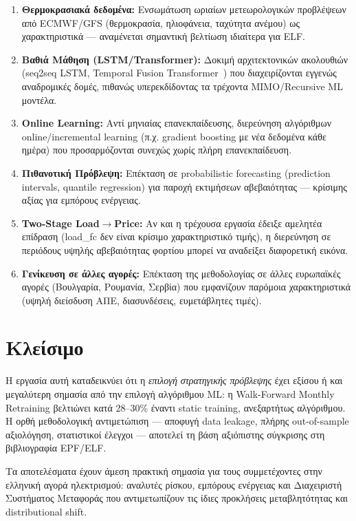 \begin{enumerate}
    \item \textbf{Θερμοκρασιακά δεδομένα:} Ενσωμάτωση ωριαίων μετεωρολογικών
    προβλέψεων από ECMWF/GFS (θερμοκρασία, ηλιοφάνεια, ταχύτητα ανέμου) ως
    χαρακτηριστικά — αναμένεται σημαντική βελτίωση ιδιαίτερα για ELF.

    \item \textbf{Βαθιά Μάθηση (LSTM/Transformer):} Δοκιμή αρχιτεκτονικών
    ακολουθιών (seq2seq LSTM, Temporal Fusion Transformer~\cite{lim2021temporal})
    που διαχειρίζονται εγγενώς αναδρομικές δομές, πιθανώς υπερεκδίδοντας τα
    τρέχοντα MIMO/Recursive ML μοντέλα.

    \item \textbf{Online Learning:} Αντί μηνιαίας επανεκπαίδευσης, διερεύνηση
    αλγόριθμων online/incremental learning (π.χ. gradient boosting με
    νέα δεδομένα κάθε ημέρα) που προσαρμόζονται συνεχώς χωρίς πλήρη
    επανεκπαίδευση.

    \item \textbf{Πιθανοτική Πρόβλεψη:} Επέκταση σε probabilistic forecasting
    (prediction intervals, quantile regression) για παροχή εκτιμήσεων
    αβεβαιότητας — κρίσιμης αξίας για εμπόρους ενέργειας.

    \item \textbf{Two-Stage Load$\to$Price:} Αν και η τρέχουσα εργασία έδειξε
    αμελητέα επίδραση (load\_fc δεν είναι κρίσιμο χαρακτηριστικό τιμής),
    η διερεύνηση σε περιόδους υψηλής αβεβαιότητας φορτίου μπορεί να
    αναδείξει διαφορετική εικόνα.

    \item \textbf{Γενίκευση σε άλλες αγορές:} Επέκταση της μεθοδολογίας σε
    άλλες ευρωπαϊκές αγορές (Βουλγαρία, Ρουμανία, Σερβία) που εμφανίζουν
    παρόμοια χαρακτηριστικά (υψηλή διείσδυση ΑΠΕ, διασυνδέσεις, ευμετάβλητες
    τιμές).
\end{enumerate}

\section{Κλείσιμο}
\label{sec:conc_closing}

Η εργασία αυτή καταδεικνύει ότι η \textit{επιλογή στρατηγικής πρόβλεψης} έχει
εξίσου ή και μεγαλύτερη σημασία από την επιλογή αλγόριθμου ML: η Walk-Forward
Monthly Retraining βελτιώνει κατά 28--30\% έναντι static training, ανεξαρτήτως
αλγόριθμου. Η ορθή μεθοδολογική αντιμετώπιση — αποφυγή data leakage, πλήρης
out-of-sample αξιολόγηση, στατιστικοί έλεγχοι — αποτελεί τη βάση αξιόπιστης
σύγκρισης στη βιβλιογραφία EPF/ELF.

Τα αποτελέσματα έχουν άμεση πρακτική σημασία για τους συμμετέχοντες στην
ελληνική αγορά ηλεκτρισμού: αναλυτές ρίσκου, εμπόρους ενέργειας και Διαχειριστή
Συστήματος Μεταφοράς που αντιμετωπίζουν τις ίδιες προκλήσεις μεταβλητότητας
και distributional shift.
